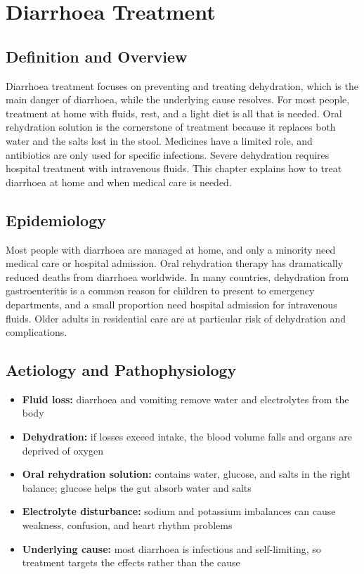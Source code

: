 \chapter{Diarrhoea Treatment}

\section*{Definition and Overview}
Diarrhoea treatment focuses on preventing and treating dehydration, which is the main danger of diarrhoea, while the underlying cause resolves. For most people, treatment at home with fluids, rest, and a light diet is all that is needed. Oral rehydration solution is the cornerstone of treatment because it replaces both water and the salts lost in the stool. Medicines have a limited role, and antibiotics are only used for specific infections. Severe dehydration requires hospital treatment with intravenous fluids. This chapter explains how to treat diarrhoea at home and when medical care is needed.

\section*{Epidemiology}
Most people with diarrhoea are managed at home, and only a minority need medical care or hospital admission. Oral rehydration therapy has dramatically reduced deaths from diarrhoea worldwide. In many countries, dehydration from gastroenteritis is a common reason for children to present to emergency departments, and a small proportion need hospital admission for intravenous fluids. Older adults in residential care are at particular risk of dehydration and complications.

\section*{Aetiology and Pathophysiology}
\begin{itemize}
    \item \textbf{Fluid loss:} diarrhoea and vomiting remove water and electrolytes from the body
    \item \textbf{Dehydration:} if losses exceed intake, the blood volume falls and organs are deprived of oxygen
    \item \textbf{Oral rehydration solution:} contains water, glucose, and salts in the right balance; glucose helps the gut absorb water and salts
    \item \textbf{Electrolyte disturbance:} sodium and potassium imbalances can cause weakness, confusion, and heart rhythm problems
    \item \textbf{Underlying cause:} most diarrhoea is infectious and self-limiting, so treatment targets the effects rather than the cause
\end{itemize}

